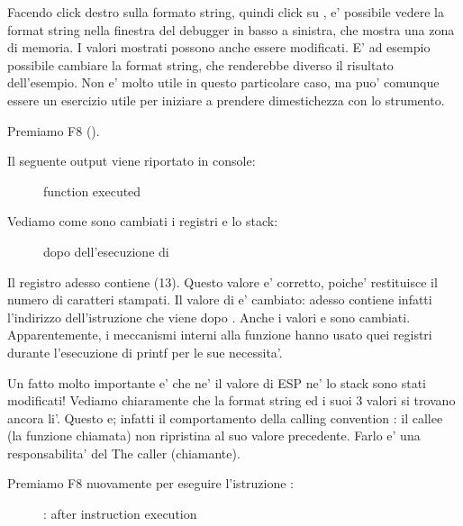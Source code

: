 Facendo click destro sulla formato string, quindi click su ,
e' possibile vedere la format string nella finestra del debugger in basso a sinistra, che mostra una zona di memoria.
I valori mostrati possono anche essere modificati.
E' ad esempio possibile cambiare la format string, che renderebbe diverso il risultato dell'esempio.
Non e' molto utile in questo particolare caso, ma puo' comunque essere un esercizio utile per iniziare a prendere dimestichezza con lo strumento.

\clearpage
Premiamo F8 (\stepover).

Il seguente output viene riportato in console:

\begin{figure}[H]
\centering
{}
\caption{\printf function executed}
\end{figure}

Vediamo come sono cambiati i registri e lo stack:

\begin{figure}[H]
\centering
{}
\caption{\olly dopo dell'esecuzione di \printf{}}
\label{fig:printf3_olly_3}
\end{figure}

Il registro \EAX adesso contiene  (13).
Questo valore e' corretto, poiche' \printf restituisce il numero di caratteri stampati. 
Il valore di \EIP e' cambiato: adesso contiene infatti l'indirizzo dell'istruzione che viene dopo .
Anche i valori \ECX e \EDX sono cambiati.
Apparentemente, i meccanismi interni alla funzione \printf hanno usato quei registri durante l'esecuzione di printf per le sue necessita'.

Un fatto molto importante e' che ne' il valore di ESP ne' lo stack sono stati modificati!
Vediamo chiaramente che la format string ed i suoi 3 valori si trovano ancora li'.
Questo e; infatti il comportamento della calling convention : il \gls{callee} (la funzione chiamata) non ripristina
\ESP al suo valore precedente. Farlo e' una responsabilita' del The \gls{caller} (chiamante).

\clearpage
Premiamo F8 nuovamente per eseguire l'istruzione :

\begin{figure}[H]
\centering
{}
\caption{\olly: after  instruction execution}
\label{fig:printf3_olly_4}
\end{figure}

